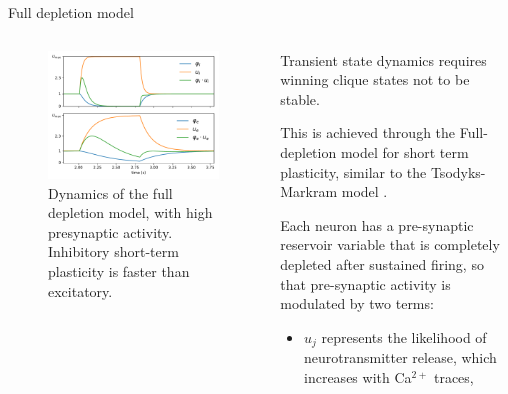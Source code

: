 \documentclass[final,hyperref={pdfpagelabels=false}]{beamer}
\begin{document}
\begin{frame}
\begin{columns}
\begin{column}{.64\textwidth}
\begin{minipage}[T]{.95\textwidth}
{					%
					\begin{block}{Full depletion model}
						\begin{columns}
							\begin{column}[T]{.5\textwidth}
							\begin{figure}
								\includegraphics[width=1\linewidth]{double_depletion.pdf}
								\caption{Dynamics of the full depletion model, with high presynaptic activity.  Inhibitory short-term plasticity is faster than excitatory.}
								\label{fig:full_depletion}
							\end{figure}	
							\end{column}							
							
							\begin{column}[T]{.5\textwidth}
								Transient state dynamics requires winning clique states not to be stable. 
								
								This is achieved through the Full-depletion model for short term plasticity, similar to the Tsodyks-Markram model \cite{tsodyks2008model}.
								
								Each neuron has a pre-synaptic reservoir variable that is completely depleted after sustained firing, so that pre-synaptic activity is modulated by two terms:
								\begin{itemize}
									\item $u_j$ represents the likelihood of neurotransmitter release, which increases with Ca$^{2+}$ traces,
									

\end{itemize}
\end{column}
\end{columns}
\end{block}}
\end{minipage}
\end{column}
\end{columns}
\end{frame}
\end{document}
